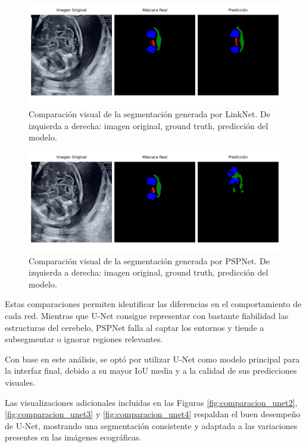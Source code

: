 \begin{figure}[h]
    \centering
    \includegraphics[width=1\textwidth]{img/image1_linknet.png}
    \caption{Comparación visual de la segmentación generada por LinkNet. De izquierda a derecha: imagen original, ground truth, predicción del modelo.}
    \label{fig:comparacion_linknet}
\end{figure}

\begin{figure}[h]
    \centering
    \includegraphics[width=1\textwidth]{img/image1_pspnet.png}
    \caption{Comparación visual de la segmentación generada por PSPNet. De izquierda a derecha: imagen original, ground truth, predicción del modelo.}
    \label{fig:comparacion_pspnet}
\end{figure}

Estas comparaciones permiten identificar las diferencias en el comportamiento de cada red. Mientras que U-Net consigue representar con bastante fiabilidad las estructuras del cerebelo, PSPNet falla al captar los entornos y tiende a subsegmentar o ignorar regiones relevantes.

Con base en este análisis, se optó por utilizar U-Net como modelo principal para la interfaz final, debido a su mayor IoU media y a la calidad de sus predicciones visuales.

Las visualizaciones adicionales incluidas en las Figuras \ref{fig:comparacion_unet2}, \ref{fig:comparacion_unet3} y \ref{fig:comparacion_unet4} respaldan el buen desempeño de U-Net, mostrando una segmentación consistente y adaptada a las variaciones presentes en las imágenes ecográficas.

